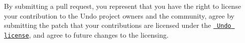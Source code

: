 By submitting a pull request, you represent that you have the right to license your contribution to the Undo project owners and the community, agree by submitting the patch that your contributions are licensed under the \href{https://raw.githubusercontent.com/dacap/undo/main/LICENSE.txt}{\texttt{ Undo license}}, and agree to future changes to the licensing. 